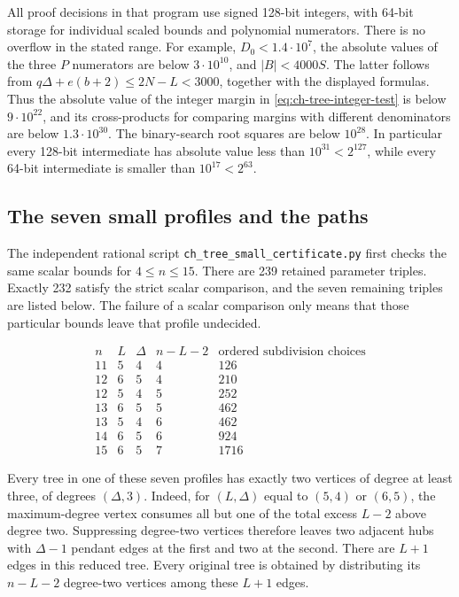 \documentclass[11pt,a4paper]{article}
\theoremstyle{remark}
\numberwithin{equation}{section}
\begin{document}
All proof decisions in that program use signed 128-bit integers, with
64-bit storage for individual scaled bounds and polynomial numerators.
There is no overflow in the stated range. For example, $D_0<1.4\cdot10^7$,
the absolute values of the three $P$ numerators are below $3\cdot10^{10}$,
and $|B|<4000S$. The latter follows from
$q\Delta+e(b+2)\le2N-L<3000$, together with the displayed formulas.
Thus the absolute value of the integer margin in
\eqref{eq:ch-tree-integer-test} is below $9\cdot10^{22}$, and its
cross-products for comparing margins with different denominators are
below $1.3\cdot10^{30}$. The binary-search root squares are below
$10^{28}$. In particular every 128-bit intermediate has absolute value
less than $10^{31}<2^{127}$, while every 64-bit intermediate is smaller
than $10^{17}<2^{63}$.

\subsection{The seven small profiles and the paths}

The independent rational script
\texttt{ch\_tree\_small\_certificate.py} first checks the same scalar
bounds for $4\le n\le15$. There are 239 retained parameter triples.
Exactly 232 satisfy the strict scalar comparison, and the seven remaining
triples are listed below. The failure of a scalar comparison only means
that those particular bounds leave that profile undecided.

\[
\begin{array}{c|c|c|c|r}
 n&L&\Delta&n-L-2&\text{ordered subdivision choices}\\\hline
 11&5&4&4&126\\
 12&6&5&4&210\\
 12&5&4&5&252\\
 13&6&5&5&462\\
 13&5&4&6&462\\
 14&6&5&6&924\\
 15&6&5&7&1716
\end{array}
\]

Every tree in one of these seven profiles has exactly two vertices of
degree at least three, of degrees $(\Delta,3)$. Indeed, for $(L,\Delta)$
equal to $(5,4)$ or $(6,5)$, the maximum-degree vertex consumes all but
one of the total excess $L-2$ above degree two. Suppressing degree-two
vertices therefore leaves two adjacent hubs with $\Delta-1$ pendant
edges at the first and two at the second. There are $L+1$ edges in this
reduced tree. Every original tree is obtained by distributing its
$n-L-2$ degree-two vertices among these $L+1$ edges.
\end{document}
